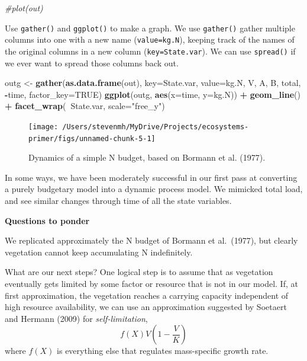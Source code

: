 \documentclass[
]{book}
\newenvironment{Shaded}{\begin{snugshade}}{\end{snugshade}}
\newcommand{\CommentTok}[1]{\textcolor[rgb]{0.56,0.35,0.01}{\textit{#1}}}
\newcommand{\DataTypeTok}[1]{\textcolor[rgb]{0.13,0.29,0.53}{#1}}
\newcommand{\KeywordTok}[1]{\textcolor[rgb]{0.13,0.29,0.53}{\textbf{#1}}}
\newcommand{\NormalTok}[1]{#1}
\newcommand{\OperatorTok}[1]{\textcolor[rgb]{0.81,0.36,0.00}{\textbf{#1}}}
\newcommand{\OtherTok}[1]{\textcolor[rgb]{0.56,0.35,0.01}{#1}}
\newcommand{\StringTok}[1]{\textcolor[rgb]{0.31,0.60,0.02}{#1}}
\begin{document}
\begin{Shaded}
\begin{Highlighting}[]
\CommentTok{#plot(out)}
\end{Highlighting}
\end{Shaded}

Use \texttt{gather()} and \texttt{ggplot()} to make a graph. We use \texttt{gather()} gather multiple columns into one with a new name (\texttt{value=kg.N}), keeping track of the names of the original columns in a new column (\texttt{key=State.var}). We can use \texttt{spread()} if we ever want to spread those columns back out.

\begin{Shaded}
\begin{Highlighting}[]
\NormalTok{outg <-}\StringTok{ }\KeywordTok{gather}\NormalTok{(}\KeywordTok{as.data.frame}\NormalTok{(out), }\DataTypeTok{key=}\NormalTok{State.var, }\DataTypeTok{value=}\NormalTok{kg.N, }
\NormalTok{              V, A, B, total, }\OperatorTok{-}\NormalTok{time,}
              \DataTypeTok{factor_key=}\OtherTok{TRUE}\NormalTok{)}
\KeywordTok{ggplot}\NormalTok{(outg, }\KeywordTok{aes}\NormalTok{(}\DataTypeTok{x=}\NormalTok{time, }\DataTypeTok{y=}\NormalTok{kg.N)) }\OperatorTok{+}\StringTok{ }\KeywordTok{geom_line}\NormalTok{() }\OperatorTok{+}\StringTok{ }\KeywordTok{facet_wrap}\NormalTok{(}\OperatorTok{~}\NormalTok{State.var, }\DataTypeTok{scale=}\StringTok{"free_y"}\NormalTok{)}
\end{Highlighting}
\end{Shaded}

\begin{figure}
\texttt{[image: /Users/stevenmh/MyDrive/Projects/ecosystems-primer/figs/unnamed-chunk-5-1]} \caption{Dynamics of a simple N budget, based on Bormann et al. (1977).}\label{fig:unnamed-chunk-5}
\end{figure}

In some ways, we have been moderately successful in our first pass at
converting a purely budgetary model into a dynamic process model. We
mimicked total load, and see similar changes through time of all the
state variables.

\textbf{Questions to ponder}

We replicated approximately the N budget of Bormann et al.~(1977), but
clearly vegetation cannot keep accumulating N indefinitely.

What are our next steps? One logical step is to assume that as vegetation eventually gets limited by some factor or resource that is not in our model. If, at first approximation, the vegetation reaches a carrying capacity independent of high resource availability, we can use an approximation suggested by Soetaert and Hermann (2009) for \emph{self-limitation},
\[f(X)V\left(1-\frac{V}{K}\right)\]
where \(f(X)\) is everything else that regulates mass-specific growth rate.
\end{document}
